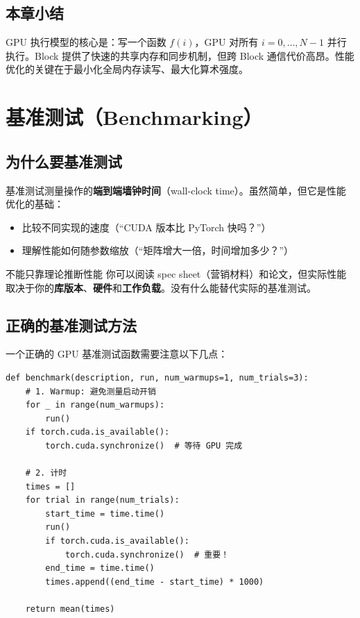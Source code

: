 \documentclass[a4paper]{article}
\begin{document}
\subsection{本章小结}

GPU 执行模型的核心是：写一个函数 $f(i)$，GPU 对所有 $i = 0, \dots, N-1$ 并行执行。Block 提供了快速的共享内存和同步机制，但跨 Block 通信代价高昂。性能优化的关键在于最小化全局内存读写、最大化算术强度。


\section{基准测试（Benchmarking）}

\subsection{为什么要基准测试}

基准测试测量操作的\textbf{端到端墙钟时间}（wall-clock time）。虽然简单，但它是性能优化的基础：

\begin{itemize}
    \item 比较不同实现的速度（``CUDA 版本比 PyTorch 快吗？''）
    \item 理解性能如何随参数缩放（``矩阵增大一倍，时间增加多少？''）
\end{itemize}

\begin{warningbox}{不能只靠理论推断性能}
你可以阅读 spec sheet（营销材料）和论文，但实际性能取决于你的\textbf{库版本}、\textbf{硬件}和\textbf{工作负载}。没有什么能替代实际的基准测试。
\end{warningbox}

\subsection{正确的基准测试方法}

一个正确的 GPU 基准测试函数需要注意以下几点：

\begin{lstlisting}[caption={基准测试函数模板（Python）}]
def benchmark(description, run, num_warmups=1, num_trials=3):
    # 1. Warmup: 避免测量启动开销
    for _ in range(num_warmups):
        run()
    if torch.cuda.is_available():
        torch.cuda.synchronize()  # 等待 GPU 完成

    # 2. 计时
    times = []
    for trial in range(num_trials):
        start_time = time.time()
        run()
        if torch.cuda.is_available():
            torch.cuda.synchronize()  # 重要！
        end_time = time.time()
        times.append((end_time - start_time) * 1000)

    return mean(times)
\end{lstlisting}
\end{document}
